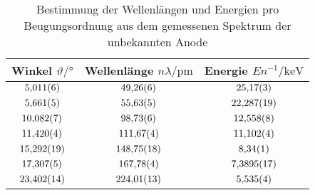 \begin{table}[htbp]
   \centering
\caption{Bestimmung der Wellenlängen und Energien pro Beugungsordnung aus dem gemessenen Spektrum der unbekannten Anode}
\begin{tabular}{c c c}
\hline Winkel $\vartheta/ \unit{\degree}$ & Wellenlänge $n\lambda / \unit{\pm}$ & Energie $En^{-1} / \unit{\kilo\electronvolt}$  \\ 
\hline
$\num{5.011\pm 0.006}$ & $\num{49.26\pm 0.06}$ & $\num{25.17\pm 0.03}$ \\
$\num{5.661\pm 0.005}$ & $\num{55.63\pm 0.05}$ & $\num{22.287\pm 0.019}$ \\
$\num{10.082\pm 0.007}$ & $\num{98.73\pm 0.06}$ & $\num{12.558\pm 0.008}$ \\
$\num{11.420\pm 0.004}$ & $\num{111.67\pm 0.04}$ & $\num{11.102\pm 0.004}$ \\
$\num{15.292\pm 0.019}$ & $\num{148.75\pm 0.18}$ & $\num{8.34\pm 0.01}$ \\
$\num{17.307\pm 0.005}$ & $\num{167.78\pm 0.04}$ & $\num{7.3895\pm 0.0017}$ \\
$\num{23.402\pm 0.014}$ & $\num{224.01\pm 0.13}$ & $\num{5.535\pm 0.004}$ \\
\hline\end{tabular}
\label{tab:anode-unbekannt}
\end{table}